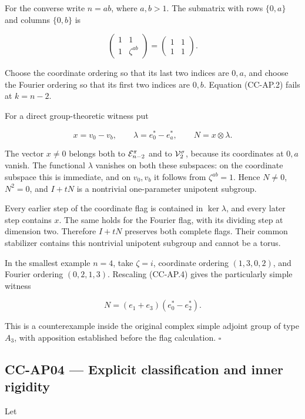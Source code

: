For the converse write \(n=ab\), where \(a,b>1\). The submatrix with
rows \(\{0,a\}\) and columns \(\{0,b\}\) is

\[
 \begin{pmatrix}1&1\\1&\zeta^{ab}\end{pmatrix}
 =\begin{pmatrix}1&1\\1&1\end{pmatrix}.
\]

Choose the coordinate ordering so that its last two indices are \(0,a\),
and choose the Fourier ordering so that its first two indices are
\(0,b\). Equation (CC-AP.2) fails at \(k=n-2\).

For a direct group-theoretic witness put

\[
 x=v_0-v_b,\qquad
 \lambda=e_0^*-e_a^*,\qquad
 N=x\otimes\lambda.
 \tag{CC-AP.4}
\]

The vector \(x\ne0\) belongs both to \({\cal E}_{n-2}^{\pi}\) and to
\({\cal V}_2^\sigma\), because its coordinates at \(0,a\) vanish. The
functional \(\lambda\) vanishes on both these subspaces: on the
coordinate subspace this is immediate, and on \(v_0,v_b\) it follows
from \(\zeta^{ab}=1\). Hence \(N\ne0\), \(N^2=0\), and \(I+tN\) is a
nontrivial one-parameter unipotent subgroup.

Every earlier step of the coordinate flag is contained in
\(\ker\lambda\), and every later step contains \(x\). The same holds for
the Fourier flag, with its dividing step at dimension two. Therefore
\(I+tN\) preserves both complete flags. Their common stabilizer contains
this nontrivial unipotent subgroup and cannot be a torus.

In the smallest example \(n=4\), take \(\zeta=i\), coordinate ordering
\((1,3,0,2)\), and Fourier ordering \((0,2,1,3)\). Rescaling (CC-AP.4)
gives the particularly simple witness

\[
 N=(e_1+e_3)(e_0^*-e_2^*).
\]

This is a counterexample inside the original complex simple adjoint
group of type \(A_3\), with apposition established before the flag
calculation. \(\square\)

\subsection{CC-AP04 --- Explicit classification and inner
rigidity}\label{cc-ap04-explicit-classification-and-inner-rigidity}

Let

